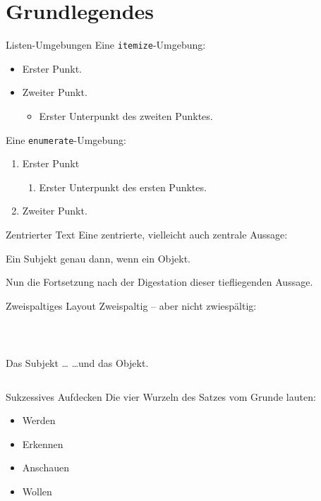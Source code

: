 \section{Grundlegendes}

\begin{frame}{Listen-Umgebungen}
  Eine \texttt{itemize}-Umgebung:
  \begin{itemize}
    \item Erster Punkt.
    \item Zweiter Punkt.
          \begin{itemize}
            \item Erster Unterpunkt des zweiten Punktes.
          \end{itemize}
  \end{itemize}

  Eine \texttt{enumerate}-Umgebung:

  \begin{enumerate}
    \item Erster Punkt
          \begin{enumerate}
            \item Erster Unterpunkt des ersten Punktes.
          \end{enumerate}
    \item Zweiter Punkt.
  \end{enumerate}
\end{frame}

\begin{frame}{Zentrierter Text}
  Eine zentrierte, vielleicht auch zentrale Aussage:
  \begin{center}
    Ein Subjekt genau dann, wenn ein Objekt.
  \end{center}
  \pause\par%
  Nun die Fortsetzung nach der Digestation dieser tiefliegenden Aussage.
\end{frame}

\begin{frame}{Zweispaltiges Layout}
  Zweispaltig – aber nicht zwiespältig:
  \par{}~%
  \begin{columns}
     Das Subjekt \dots
     \dots und das Objekt.
  \end{columns}
\end{frame}

\begin{frame}{Sukzessives Aufdecken}
  Die vier Wurzeln des Satzes vom Grunde lauten:
  \begin{itemize}[<+->]
    \item Werden
    \item Erkennen
    \item Anschauen
    \item Wollen
  \end{itemize}
\end{frame}

